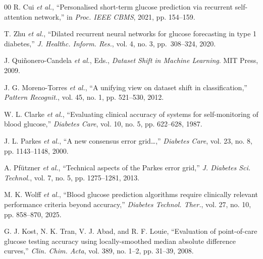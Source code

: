 \documentclass[conference]{IEEEtran}
\begin{document}
\begin{thebibliography}{00}
R. Cui \emph{et al.}, ``Personalised short-term glucose prediction via recurrent
self-attention network,'' in \emph{Proc. IEEE CBMS}, 2021, pp. 154--159.

T. Zhu \emph{et al.}, ``Dilated recurrent neural networks for glucose forecasting
in type 1 diabetes,'' \emph{J. Healthc. Inform. Res.}, vol. 4, no. 3, pp.\ 308--324, 2020.

J. Qui\~{n}onero-Candela \emph{et al.}, Eds., \emph{Dataset Shift in Machine
Learning}. MIT Press, 2009.

J. G. Moreno-Torres \emph{et al.}, ``A unifying view on dataset shift in
classification,'' \emph{Pattern Recognit.}, vol. 45, no. 1, pp. 521--530, 2012.

W. L. Clarke \emph{et al.}, ``Evaluating clinical accuracy of systems for
self-monitoring of blood glucose,'' \emph{Diabetes Care}, vol. 10, no. 5, pp.
622--628, 1987.

J. L. Parkes \emph{et al.}, ``A new consensus error grid\ldots,'' \emph{Diabetes
Care}, vol. 23, no. 8, pp. 1143--1148, 2000.

A. Pf\"{u}tzner \emph{et al.}, ``Technical aspects of the Parkes error grid,''
\emph{J. Diabetes Sci. Technol.}, vol. 7, no. 5, pp. 1275--1281, 2013.

M. K. Wolff \emph{et al.}, ``Blood glucose prediction algorithms require
clinically relevant performance criteria beyond accuracy,'' \emph{Diabetes
Technol. Ther.}, vol. 27, no. 10, pp. 858--870, 2025.

G. J. Kost, N. K. Tran, V. J. Abad, and R. F. Louie, ``Evaluation of
point-of-care glucose testing accuracy using locally-smoothed median absolute
difference curves,'' \emph{Clin. Chim. Acta}, vol. 389, no. 1--2, pp. 31--39, 2008.

\end{thebibliography}
\end{document}
